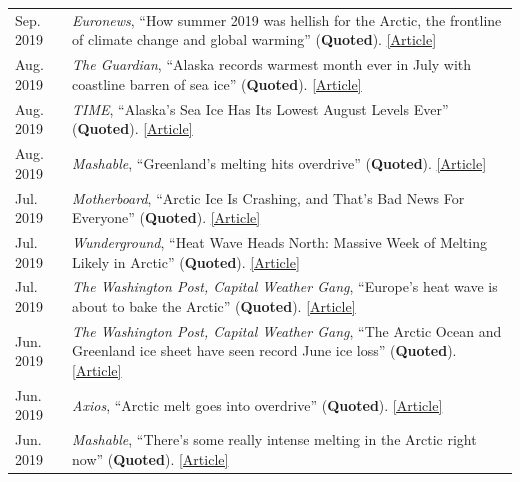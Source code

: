 \documentclass[margin,line,palatino,courier,10pt]{res}
\begin{document}
\begin{resume}
\begin{tabular}{@{}p{0.9in}p{4in}}
Sep. 2019 & \textit{Euronews}, ``How summer 2019 was hellish for the Arctic, the frontline of climate change and global warming'' (\textbf{Quoted}). \href{https://www.euronews.com/2019/09/18/how-2019-was-hellish-for-the-arctic-the-frontline-of-climate-change-and-global-warming}{[Article]}\\
Aug. 2019 & \textit{The Guardian}, ``Alaska records warmest month ever in July with coastline barren of sea ice'' (\textbf{Quoted}). \href{https://www.theguardian.com/us-news/2019/aug/08/alaska-warmest-month-ever-july-2019-sea-ice}{[Article]}\\
Aug. 2019 & \textit{TIME}, ``Alaska's Sea Ice Has Its Lowest August Levels Ever'' (\textbf{Quoted}). \href{https://time.com/5646168/alaska-sea-ice-melted/}{[Article]}\\
Aug. 2019 & \textit{Mashable}, ``Greenland's melting hits overdrive'' (\textbf{Quoted}). \href{https://mashable.com/article/greenland-melting-spike-climate-change/}{[Article]}\\
Jul. 2019 & \textit{Motherboard}, ``Arctic Ice Is Crashing, and That's Bad News For Everyone'' (\textbf{Quoted}). \href{https://www.vice.com/en_us/article/qv7gzm/arctic-ice-is-crashing-and-thats-bad-news-for-everyone}{[Article]}\\
Jul. 2019 & \textit{Wunderground}, ``Heat Wave Heads North: Massive Week of Melting Likely in Arctic'' (\textbf{Quoted}). \href{https://www.wunderground.com/cat6/Heat-Wave-Heads-North-Massive-Week-Melting-Likely-Arctic}{[Article]}\\
Jul. 2019 & \textit{The Washington Post, Capital Weather Gang}, ``Europe's heat wave is about to bake the Arctic'' (\textbf{Quoted}). \href{https://www.washingtonpost.com/weather/2019/07/26/europes-heat-wave-is-about-bake-arctic/?utm_term=.f57032deb299}{[Article]}\\
Jun. 2019 & \textit{The Washington Post, Capital Weather Gang}, ``The Arctic Ocean and Greenland ice sheet have seen record June ice loss'' (\textbf{Quoted}). \href{https://www.washingtonpost.com/weather/2019/06/14/arctic-ocean-greenland-ice-sheet-have-seen-record-june-ice-loss/?utm_term=.7539db99ca6e}{[Article]}\\
Jun. 2019 & \textit{Axios}, ``Arctic melt goes into overdrive'' (\textbf{Quoted}). \href{https://www.axios.com/newsletters/axios-science-9172185b-a9a1-498f-9014-4ee04e1ff826.html?chunk=3#story3}{[Article]}\\
Jun. 2019 & \textit{Mashable}, ``There's some really intense melting in the Arctic right now'' (\textbf{Quoted}). \href{https://mashable.com/article/arctic-melting-records/}{[Article]}\\

\end{tabular}
\end{resume}
\end{document}
